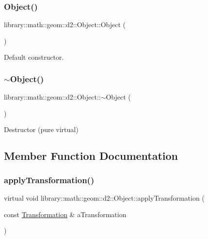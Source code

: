 \subsubsection{\texorpdfstring{Object()}{Object()}}
{\footnotesize\ttfamily library\+::math\+::geom\+::d2\+::\+Object\+::\+Object (\begin{DoxyParamCaption}{ }\end{DoxyParamCaption})\hspace{0.3cm}{\ttfamily [default]}}



Default constructor. 

\mbox{\label{classlibrary_1_1math_1_1geom_1_1d2_1_1_object_a092ca69d924f7226fceeb35f5532887c}} 
\subsubsection{\texorpdfstring{$\sim$\+Object()}{~Object()}}
{\footnotesize\ttfamily library\+::math\+::geom\+::d2\+::\+Object\+::$\sim$\+Object (\begin{DoxyParamCaption}{ }\end{DoxyParamCaption})\hspace{0.3cm}{\ttfamily [pure virtual]}}



Destructor (pure virtual) 



\subsection{Member Function Documentation}
\mbox{\label{classlibrary_1_1math_1_1geom_1_1d2_1_1_object_a289589fb6e9e7a2c4ca4976a1544def5}} 
\subsubsection{\texorpdfstring{apply\+Transformation()}{applyTransformation()}}
{\footnotesize\ttfamily virtual void library\+::math\+::geom\+::d2\+::\+Object\+::apply\+Transformation (\begin{DoxyParamCaption}\item[{const \hyperlink{classlibrary_1_1math_1_1geom_1_1d2_1_1_transformation}{Transformation} \&}]{a\+Transformation }\end{DoxyParamCaption})\hspace{0.3cm}{\ttfamily [pure virtual]}}



